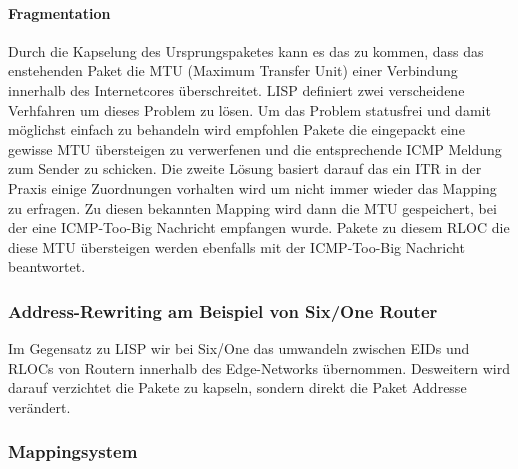 \paragraph{Fragmentation} %
Durch die Kapselung des Ursprungspaketes kann es das zu kommen, dass das enstehenden Paket die MTU (Maximum Transfer Unit) einer Verbindung innerhalb des Internetcores überschreitet. LISP definiert zwei verscheidene Verhfahren um dieses Problem zu lösen. Um das Problem statusfrei und damit möglichst einfach zu behandeln wird empfohlen Pakete die eingepackt eine gewisse MTU übersteigen zu verwerfenen und die entsprechende ICMP Meldung zum Sender zu schicken. Die zweite Lösung basiert darauf das ein ITR in der Praxis einige Zuordnungen vorhalten wird um nicht immer wieder das Mapping zu erfragen. Zu diesen bekannten Mapping wird dann die MTU gespeichert, bei der eine ICMP-Too-Big Nachricht empfangen wurde. Pakete zu diesem RLOC die diese MTU übersteigen werden ebenfalls mit der ICMP-Too-Big Nachricht beantwortet.

\subsubsection{Address-Rewriting am Beispiel von Six/One Router}
Im Gegensatz zu LISP wir bei Six/One das umwandeln zwischen EIDs und RLOCs von Routern innerhalb des Edge-Networks übernommen. Desweitern wird darauf verzichtet die Pakete zu kapseln, sondern direkt die Paket Addresse verändert. 
 
\subsubsection{Mappingsystem}


